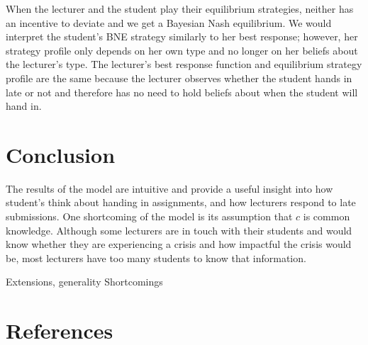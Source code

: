 \documentclass[11pt,preprint, authoryear]{elsarticle}
\numberwithin{equation}{section}
\numberwithin{figure}{section}
\numberwithin{table}{section}
\begin{document}
When the lecturer and the student play their equilibrium strategies,
neither has an incentive to deviate and we get a Bayesian Nash
equilibrium. We would interpret the student's BNE strategy similarly to
her best response; however, her strategy profile only depends on her own
type and no longer on her beliefs about the lecturer's type. The
lecturer's best response function and equilibrium strategy profile are
the same because the lecturer observes whether the student hands in late
or not and therefore has no need to hold beliefs about when the student
will hand in.

\hypertarget{conclusion}{%
\section{\texorpdfstring{Conclusion
\label{con}}{Conclusion }}\label{conclusion}}

The results of the model are intuitive and provide a useful insight into
how student's think about handing in assignments, and how lecturers
respond to late submissions. One shortcoming of the model is its
assumption that \(c\) is common knowledge. Although some lecturers are
in touch with their students and would know whether they are
experiencing a crisis and how impactful the crisis would be, most
lecturers have too many students to know that information.

Extensions, generality Shortcomings \newpage

\hypertarget{references}{%
\section*{References}\label{references}}
\end{document}
